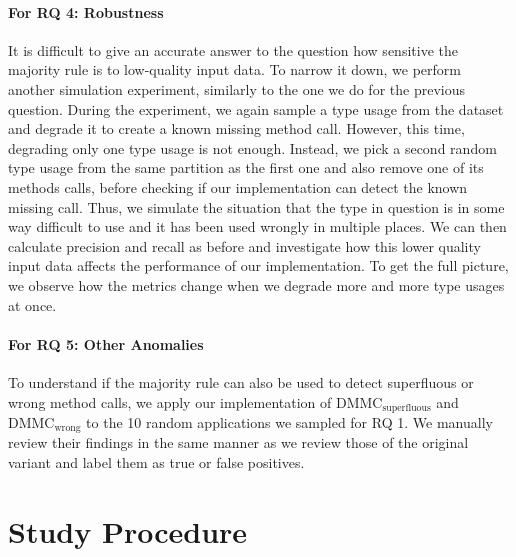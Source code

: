 \paragraph{For RQ 4: Robustness}

It is difficult to give an accurate answer to the question how sensitive the majority rule is to low-quality input data.
To narrow it down, we perform another simulation experiment, similarly to the one we do for the previous question.
During the experiment, we again sample a type usage from the dataset and degrade it to create a known missing method call.
However, this time, degrading only one type usage is not enough.
Instead, we pick a second random type usage from the same partition as the first one and also remove one of its methods calls, before checking if our implementation can detect the known missing call.
Thus, we simulate the situation that the type in question is in some way difficult to use and it has been used wrongly in multiple places.
We can then calculate precision and recall as before and investigate how this lower quality input data affects the performance of our implementation.
To get the full picture, we observe how the metrics change when we degrade more and more type usages at once.


\paragraph{For RQ 5: Other Anomalies}

To understand if the majority rule can also be used to detect superfluous or wrong method calls, we apply our implementation of $\text{DMMC}_\text{superfluous}$ and $\text{DMMC}_\text{wrong}$ to the 10 random applications we sampled for RQ 1.
We manually review their findings in the same manner as we review those of the original variant and label them as true or false positives.

\section{Study Procedure}


